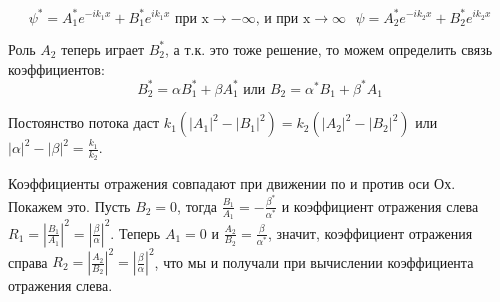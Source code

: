 $$\psi^*=A^*_1 e^{-ik_1x}+B^*_1 e^{ik_1x} \text{ при x} \rightarrow-\infty \text{, и при x} \rightarrow\infty\textit{ } \psi=A^*_2 e^{-ik_2x}+B^*_2 e^{ik_2x}$$
\par Роль $A_2$ теперь играет $B^*_2$, а т.к. это тоже решение, то можем определить связь коэффициентов:
$$B^*_2 = \alpha B^*_1 + \beta A^*_1 \textit{ или } B_2 = \alpha^* B_1 + \beta^* A_1$$
\par Постоянство потока даст $ k_1 (|A_1|^2 - |B_1|^2)=k_2 (|A_2|^2 - |B_2|^2)$ или $|\alpha|^2-|\beta|^2= \frac{k_1}{k_2}$.
\par Коэффициенты отражения совпадают при движении по и против оси Ох. Покажем это. Пусть $B_2=0$, тогда $\frac{B_1}{A_1}=-\frac{\beta^*}{\alpha^*}$ и коэффициент отражения слева $R_1 =|\frac{B_1}{A_1}|^2 = |\frac{\beta}{\alpha}|^2$. Теперь $A_1=0$ и $\frac{A_2}{B_2}=\frac{\beta}{\alpha^*}$, значит, коэффициент отражения справа $R_2 =|\frac{A_2}{B_2}|^2 = |\frac{\beta}{\alpha}|^2$, что мы и получали при вычислении коэффициента отражения слева.